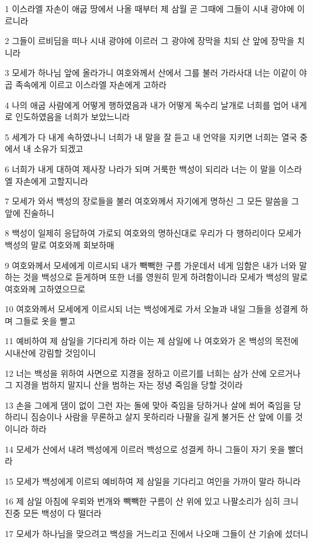 \par 1 이스라엘 자손이 애굽 땅에서 나올 때부터 제 삼월 곧 그때에 그들이 시내 광야에 이르니라
\par 2 그들이 르비딤을 떠나 시내 광야에 이르러 그 광야에 장막을 치되 산 앞에 장막을 치니라
\par 3 모세가 하나님 앞에 올라가니 여호와께서 산에서 그를 불러 가라사대 너는 이같이 야곱 족속에게 이르고 이스라엘 자손에게 고하라
\par 4 나의 애굽 사람에게 어떻게 행하였음과 내가 어떻게 독수리 날개로 너희를 업어 내게로 인도하였음을 너희가 보았느니라
\par 5 세계가 다 내게 속하였나니 너희가 내 말을 잘 듣고 내 언약을 지키면 너희는 열국 중에서 내 소유가 되겠고
\par 6 너희가 내게 대하여 제사장 나라가 되며 거룩한 백성이 되리라 너는 이 말을 이스라엘 자손에게 고할지니라
\par 7 모세가 와서 백성의 장로들을 불러 여호와께서 자기에게 명하신 그 모든 말씀을 그 앞에 진술하니
\par 8 백성이 일제히 응답하여 가로되 여호와의 명하신대로 우리가 다 행하리이다 모세가 백성의 말로 여호와께 회보하매
\par 9 여호와께서 모세에게 이르시되 내가 빽빽한 구름 가운데서 네게 임함은 내가 너와 말하는 것을 백성으로 듣게하며 또한 너를 영원히 믿게 하려함이니라 모세가 백성의 말로 여호와께 고하였으므로
\par 10 여호와께서 모세에게 이르시되 너는 백성에게로 가서 오늘과 내일 그들을 성결케 하며 그들로 옷을 빨고
\par 11 예비하여 제 삼일을 기다리게 하라 이는 제 삼일에 나 여호와가 온 백성의 목전에 시내산에 강림할 것임이니
\par 12 너는 백성을 위하여 사면으로 지경을 정하고 이르기를 너희는 삼가 산에 오르거나 그 지경을 범하지 말지니 산을 범하는 자는 정녕 죽임을 당할 것이라
\par 13 손을 그에게 댐이 없이 그런 자는 돌에 맞아 죽임을 당하거나 살에 쐬어 죽임을 당하리니 짐승이나 사람을 무론하고 살지 못하리라 나팔을 길게 불거든 산 앞에 이를 것이니라 하라
\par 14 모세가 산에서 내려 백성에게 이르러 백성으로 성결케 하니 그들이 자기 옷을 빨더라
\par 15 모세가 백성에게 이르되 예비하여 제 삼일을 기다리고 여인을 가까이 말라 하니라
\par 16 제 삼일 아침에 우뢰와 번개와 빽빽한 구름이 산 위에 있고 나팔소리가 심히 크니 진중 모든 백성이 다 떨더라
\par 17 모세가 하나님을 맞으려고 백성을 거느리고 진에서 나오매 그들이 산 기슭에 섰더니
